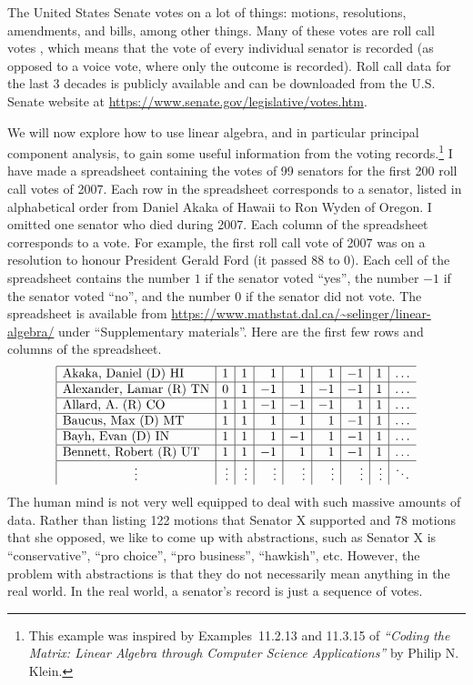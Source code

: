 The United States Senate%
%
%
 votes on a lot of things: motions,
resolutions, amendments, and bills, among other things. Many of these
votes are roll call votes%
%
, which means that the vote of every individual
senator is recorded (as opposed to a voice vote, where only the
outcome is recorded). Roll call data for the last 3 decades is
publicly available and can be downloaded from the U.S. Senate website
at \url{https://www.senate.gov/legislative/votes.htm}.

We will now explore how to use linear algebra, and in particular
principal component analysis, to gain some useful information from the
voting records.\footnote{This example was inspired by Examples~11.2.13
  and 11.3.15 of {\em ``Coding the Matrix: Linear Algebra through
    Computer Science Applications''} by Philip N. Klein.} I have made
a spreadsheet containing the votes of 99 senators for the first 200
roll call votes of 2007. Each row in the spreadsheet corresponds to a
senator, listed in alphabetical order from Daniel Akaka of Hawaii to
Ron Wyden of Oregon. I omitted one senator who died during 2007. Each
column of the spreadsheet corresponds to a vote. For example, the
first roll call vote of 2007 was on a resolution to honour President
Gerald Ford (it passed 88 to 0). Each cell of the spreadsheet contains
the number $1$ if the senator voted ``yes'', the number $-1$ if the
senator voted ``no'', and the number $0$ if the senator did not
vote. The spreadsheet is available from
\url{https://www.mathstat.dal.ca/~selinger/linear-algebra/} under
``Supplementary materials''. Here are the first few rows and columns
of the spreadsheet.
\begin{equation*}
  \begin{array}{|l|r|r|r|r|r|r|r|r}
    \hline
    \mbox{Akaka, Daniel (D) HI} & 1 & 1 & 1 & 1 & 1 & -1 & 1 & \ldots \\\hline
    \mbox{Alexander, Lamar (R) TN} & 0 & 1 & -1 & 1 & -1 & -1 & 1 & \ldots \\\hline
    \mbox{Allard, A. (R) CO} & 1 & 1 & -1 & -1 & -1 & 1 & 1 & \ldots \\\hline
    \mbox{Baucus, Max (D) MT} & 1 & 1 & 1 & 1 & 1 & -1 & 1 & \ldots \\\hline
    \mbox{Bayh, Evan (D) IN} & 1 & 1 & 1 & -1 & 1 & -1 & 1 & \ldots \\\hline
    \mbox{Bennett, Robert (R) UT} & 1 & 1 & -1 & 1 & 1 & -1 & 1 & \ldots \\\hline
    \multicolumn{1}{|c|}{\vdots} & \vdots & \vdots & \vdots & \vdots & \vdots & \vdots & \vdots & \ddots
  \end{array}
\end{equation*}
The human mind is not very well equipped to deal with such massive
amounts of data. Rather than listing 122 motions that Senator X
supported and 78 motions that she opposed, we like to come up with
abstractions, such as Senator X is ``conservative'', ``pro choice'',
``pro business'', ``hawkish'', etc. However, the problem with
abstractions is that they do not necessarily mean anything in the real
world. In the real world, a senator's record is just a sequence of
votes.

